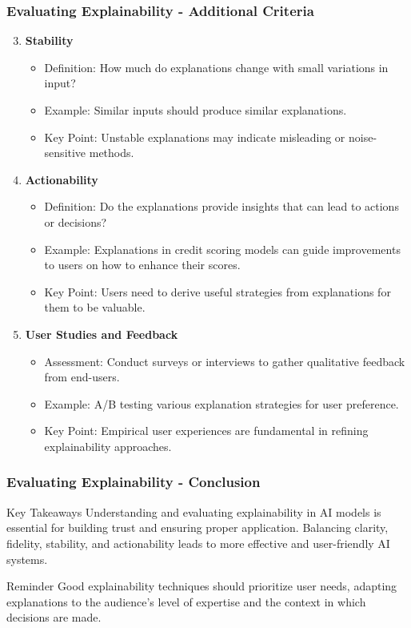 \documentclass[aspectratio=169]{beamer}
\begin{document}
\begin{frame}[fragile]
  \frametitle{Evaluating Explainability - Additional Criteria}
  \begin{enumerate}
    \setcounter{enumi}{2} %
    \item \textbf{Stability}
      \begin{itemize}
        \item Definition: How much do explanations change with small variations in input?
        \item Example: Similar inputs should produce similar explanations.
        \item Key Point: Unstable explanations may indicate misleading or noise-sensitive methods.
      \end{itemize}

    \item \textbf{Actionability}
      \begin{itemize}
        \item Definition: Do the explanations provide insights that can lead to actions or decisions?
        \item Example: Explanations in credit scoring models can guide improvements to users on how to enhance their scores.
        \item Key Point: Users need to derive useful strategies from explanations for them to be valuable.
      \end{itemize}

    \item \textbf{User Studies and Feedback}
      \begin{itemize}
        \item Assessment: Conduct surveys or interviews to gather qualitative feedback from end-users.
        \item Example: A/B testing various explanation strategies for user preference.
        \item Key Point: Empirical user experiences are fundamental in refining explainability approaches.
      \end{itemize}
  \end{enumerate}
\end{frame}

\begin{frame}[fragile]
  \frametitle{Evaluating Explainability - Conclusion}
  \begin{block}{Key Takeaways}
    Understanding and evaluating explainability in AI models is essential for building trust and ensuring proper application. Balancing clarity, fidelity, stability, and actionability leads to more effective and user-friendly AI systems.
  \end{block}
  \begin{block}{Reminder}
    Good explainability techniques should prioritize user needs, adapting explanations to the audience's level of expertise and the context in which decisions are made.
  \end{block}
\end{frame}
\end{document}
